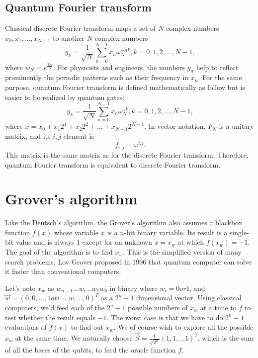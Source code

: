 \documentclass{book}
\begin{document}
\subsection{Quantum Fourier transform}
Classical discrete Fourier transform maps a set of $N$ complex numbers ${x_0, x_1, ..., x_{N-1}}$ to another $N$ complex numbers
\begin{equation}
    y_k = \frac 1 {\sqrt{N}} \sum^{N-1}_{n=0} x_n\omega_{N}^{-nk}, k = 0, 1, 2, ..., N-1,
\end{equation}
where $w_N = e^{\frac {2\pi i} N }$. For physicists and engineers, the numbers ${y_n}$ help to reflect prominently the periodic patterns such as their frequency in $x_n$. For the same purpose, quantum Fourier transform is defined mathematically as follow but is easier to be realized by quantum gates:
\begin{equation}
    y_k = \frac 1 {\sqrt{N}} \sum^{N-1}_{n=0} x_n\omega_{N}^{xk}, k = 0, 1, 2, ..., N-1,
\end{equation}
where $x = x_0 + x_1 2^1 + x_2 2^2 + ... +x_{N-1} 2^{N-1}$. In vector notation, $F_N$ is a unitary matrix, and its $i, j$ element is
\begin{equation}
    f_{i,j} = \omega^{i.j}.
\end{equation}
This matrix is the same matrix as for the discrete Fourier transform. Therefore, quantum Fourier transform is equivalent to discrete Fourier transform.

\section{Grover's algorithm}
Like the Deutsch's algorithm, the Grover's algorithm also assumes a blackbox function $f(x)$ whose variable $x$ is a $n$-bit binary variable. Its result is a single-bit value and is always 1 except for an unknown $x=x_w$ at which $f(x_w)=-1$. The goal of the algorithm is to find $x_w$. This is the simplified version of many search problems. Lov Grover proposed in 1996 that quantum computer can solve it faster than conventional computers.

Let's note $x_w$ as $w_{n-1}...w_i...w_1 w_0$ in binary where $w_i = 0 or 1$, and $\Vec{w} = (0, 0, ..., 1 at i=w, ..., 0)^T$ as a $2^n-1$ dimensional vector. Using classical computers, we'd feed each of the $2^n -1$ possible numbers of $x_w$ at a time to $f$ to test whether the result equals $-1$. The worst case is that we have to do $2^n-1$ evaluations of $f(x)$ to find out $x_w$. We of course wish to explore all the possible $x_w$ at the same time. We naturally choose $\vec{S} = \frac 1 {\sqrt{2^n}} (1, 1, ...1)^T$, which is the sum of all the bases of the qubits, to feed the oracle function $f$.
\end{document}
